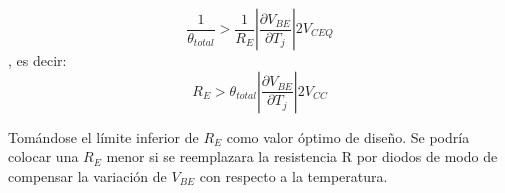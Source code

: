 \begin{equation}
	\frac{\displaystyle 1}{\displaystyle
		\theta_{total}}>\frac{\displaystyle 1}{\displaystyle
		R_{E}} \left | \frac{\displaystyle \partial V_{BE}}{\displaystyle
		\partial T_j}\right |2V_{CEQ}
\end{equation}
, es decir:
\begin{equation}
	R_E>\theta_{total}\left | \frac{\displaystyle \partial V_{BE}}{\displaystyle
		\partial T_j} \right |2V_{CC}
\end{equation}

Tomándose el límite inferior de $R_E$ como valor óptimo de diseño.
Se podría colocar una $R_E$ menor si se reemplazara la resistencia R
por diodos de modo de compensar la variación de $V_{BE}$ con
respecto a la temperatura.
